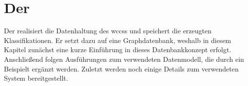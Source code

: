 \section{Der {\classificationStorage}}
    \label{section:solutionDetailsPersistence}
    Der {\classificationStorage} realisiert die Datenhaltung des \glspl{wccs}
    und speichert die erzeugten Klassifikationen.
    Er setzt dazu auf eine Graphdatenbank,
    weshalb in diesem Kapitel zunächst eine kurze Einführung
    in dieses Datenbankkonzept erfolgt.
    Anschließend folgen Ausführungen zum verwendeten Datenmodell,
    die durch ein Beispielt ergänzt werden.
    Zuletzt werden noch einige Details zum verwendeten System bereitgestellt.

    
    
    
    
